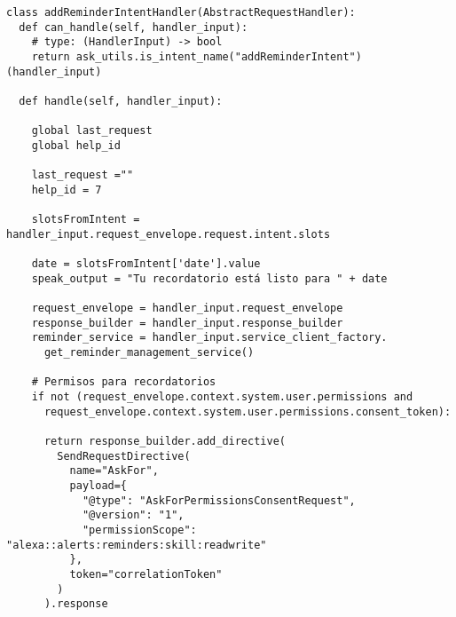 \begin{tcolorbox}[colback=white!25!white,colframe=blue]
  \begin{verbatim}
class addReminderIntentHandler(AbstractRequestHandler):
  def can_handle(self, handler_input):
    # type: (HandlerInput) -> bool
    return ask_utils.is_intent_name("addReminderIntent")(handler_input)

  def handle(self, handler_input):
        
    global last_request
    global help_id
        
    last_request =""
    help_id = 7
        
    slotsFromIntent = handler_input.request_envelope.request.intent.slots
        
    date = slotsFromIntent['date'].value
    speak_output = "Tu recordatorio está listo para " + date
        
    request_envelope = handler_input.request_envelope
    response_builder = handler_input.response_builder
    reminder_service = handler_input.service_client_factory.
      get_reminder_management_service()
        
    # Permisos para recordatorios
    if not (request_envelope.context.system.user.permissions and
      request_envelope.context.system.user.permissions.consent_token):
            
      return response_builder.add_directive(
        SendRequestDirective(
          name="AskFor",
          payload={
            "@type": "AskForPermissionsConsentRequest",
            "@version": "1",
            "permissionScope": "alexa::alerts:reminders:skill:readwrite"
          },
          token="correlationToken"
        )
      ).response
  \end{verbatim}
\end{tcolorbox}


